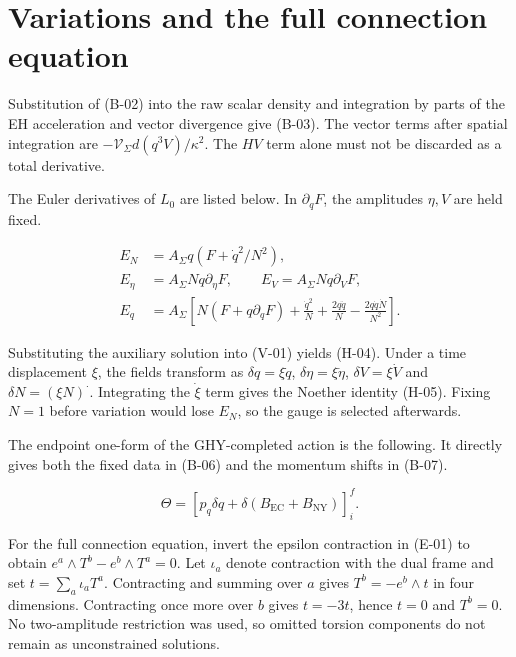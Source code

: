 \section{Variations and the full connection equation}

Substitution of (B-02) into the raw scalar density and integration by parts of the EH acceleration and vector divergence give (B-03). The vector terms after spatial integration are $-\mathcal V_{\Sigma}d(q^3V)/\kappa^2$. The $HV$ term alone must not be discarded as a total derivative.

The Euler derivatives of $L_0$ are listed below. In $\partial_qF$, the amplitudes $\eta,V$ are held fixed.

\begin{equation}\tag{V-01}\label{eq:V-01}
\begin{aligned}
E_N&=A_{\Sigma}q(F+\dot q^2/N^2),\\
E_{\eta}&=A_{\Sigma}Nq\partial_{\eta}F,\qquad
E_V=A_{\Sigma}Nq\partial_VF,\\
E_q&=A_{\Sigma}\left[N(F+q\partial_qF)+\frac{\dot q^2}{N}
+\frac{2q\ddot q}{N}-\frac{2q\dot q\dot N}{N^2}\right].
\end{aligned}
\end{equation}

Substituting the auxiliary solution into (V-01) yields (H-04). Under a time displacement $\xi$, the fields transform as $\delta q=\xi\dot q$, $\delta\eta=\xi\dot\eta$, $\delta V=\xi\dot V$ and $\delta N=(\xi N)^{\boldsymbol\cdot}$. Integrating the $\dot\xi$ term gives the Noether identity (H-05). Fixing $N=1$ before variation would lose $E_N$, so the gauge is selected afterwards.

The endpoint one-form of the GHY-completed action is the following. It directly gives both the fixed data in (B-06) and the momentum shifts in (B-07).

\begin{equation}\tag{V-02}\label{eq:V-02}
\Theta=\left[p_q\delta q+\delta(B_{\mathrm{EC}}+B_{\mathrm{NY}})\right]_i^f.
\end{equation}

For the full connection equation, invert the epsilon contraction in (E-01) to obtain $e^a\wedge T^b-e^b\wedge T^a=0$. Let $\iota_a$ denote contraction with the dual frame and set $t=\sum_a\iota_aT^a$. Contracting and summing over $a$ gives $T^b=-e^b\wedge t$ in four dimensions. Contracting once more over $b$ gives $t=-3t$, hence $t=0$ and $T^b=0$. No two-amplitude restriction was used, so omitted torsion components do not remain as unconstrained solutions.

